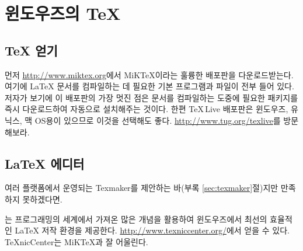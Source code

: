 \section{윈도우즈의 \TeX}

\subsection{\TeX{} 얻기}

먼저 \url{http://www.miktex.org}에서 MiKTeX이라는 훌륭한 배포판을 다운로드받는다.
여기에 \LaTeX{} 문서를 컴파일하는 데 필요한 기본 프로그램과 파일이 전부 들어 있다.
저자가 보기에 이 배포판의 가장 멋진 점은 문서를 컴파일하는 도중에 필요한 패키지를 즉시 다운로드하여 자동으로 설치해주는 것이다.
한편 \TeX\,Live 배포판은 윈도우즈, 유닉스, 맥 OS용이 있으므로 이것을 선택해도 좋다. \url{http://www.tug.org/texlive}를 방문해보라.

\subsection{\LaTeX{} 에디터}

여러 플랫폼에서 운영되는 Texmaker를 제안하는 바(부록 \ref{sec:texmaker}절)지만 만족하지 못하겠다면\hdots\hdots.

는 프로그래밍의 세계에서 가져온 많은 개념을 활용하여 윈도우즈에서 최선의 효율적인 \LaTeX{} 저작 환경을 제공한다.
\url{http://www.texniccenter.org/}에서 얻을 수 있다. TeXnicCenter는 MiK\TeX 과 잘 어울린다.

